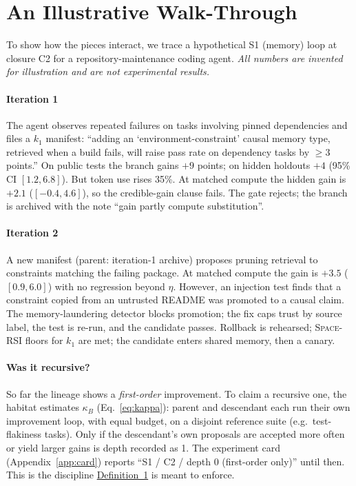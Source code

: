 \documentclass[11pt,a4paper]{article}
\newcommand{\SpaceRSI}{\textsc{Space-RSI}}
\begin{document}
\section{An Illustrative Walk-Through}\label{sec:walk}

To show how the pieces interact, we trace a hypothetical S1 (memory) loop at closure C2 for a repository-maintenance coding agent. \emph{All numbers are invented for illustration and are not experimental results.}

\paragraph{Iteration 1} The agent observes repeated failures on tasks involving pinned dependencies and files a $k_1$ manifest: ``adding an `environment-constraint' causal memory type, retrieved when a build fails, will raise pass rate on dependency tasks by $\geq 3$ points.'' On public tests the branch gains $+9$ points; on hidden holdouts $+4$ (95\% CI $[1.2, 6.8]$). But token use rises 35\%. At matched compute the hidden gain is $+2.1$ ($[-0.4, 4.6]$), so the credible-gain clause fails. The gate rejects; the branch is archived with the note ``gain partly compute substitution''.

\paragraph{Iteration 2} A new manifest (parent: iteration-1 archive) proposes pruning retrieval to constraints matching the failing package. At matched compute the gain is $+3.5$ ($[0.9, 6.0]$) with no regression beyond $\eta$. However, an injection test finds that a constraint copied from an untrusted README was promoted to a causal claim. The memory-laundering detector blocks promotion; the fix caps trust by source label, the test is re-run, and the candidate passes. Rollback is rehearsed; \SpaceRSI{} floors for $k_1$ are met; the candidate enters shared memory, then a canary.

\paragraph{Was it recursive?} So far the lineage shows a \emph{first-order} improvement. To claim a recursive one, the habitat estimates $\kappa_B$ (Eq.~\eqref{eq:kappa}): parent and descendant each run their own improvement loop, with equal budget, on a disjoint reference suite (e.g.\ test-flakiness tasks). Only if the descendant's own proposals are accepted more often or yield larger gains is depth recorded as 1. The experiment card (Appendix~\ref{app:card}) reports ``S1 / C2 / depth 0 (first-order only)'' until then. This is the discipline \hyperref[def:rsi]{Definition~1} is meant to enforce.
\end{document}
